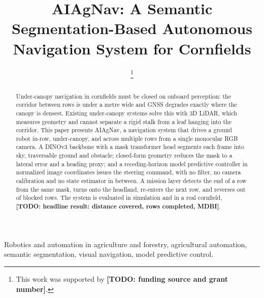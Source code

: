\documentclass[conference]{IEEEtran}
\newcommand{\TODO}[1]{\textbf{[TODO: #1]}}
\begin{document}
\title{AIAgNav: A Semantic Segmentation-Based Autonomous\\
       Navigation System for Cornfields}

\author{
%
\thanks{This work was supported by \TODO{funding source and grant number}.}}

\maketitle

\begin{abstract}
Under-canopy navigation in cornfields must be closed on onboard perception:
the corridor between rows is under a metre wide and GNSS degrades exactly where
the canopy is densest. Existing under-canopy systems solve this with 3D LiDAR,
which measures geometry and cannot separate a rigid stalk from a leaf hanging
into the corridor. This paper presents AIAgNav, a navigation system that drives
a ground robot in-row, under-canopy, and across multiple rows from a single
monocular RGB camera. A DINOv3 backbone with a mask transformer head segments
each frame into sky, traversable ground and obstacle; closed-form geometry
reduces the mask to a lateral error and a heading proxy; and a receding-horizon
model predictive controller in normalized image coordinates issues the steering
command, with no filter, no camera calibration and no state estimator in
between. A mission layer detects the end of a row from the same mask, turns onto
the headland, re-enters the next row, and reverses out of blocked rows. The
system is evaluated in simulation and in a real cornfield,
\TODO{headline result: distance covered, rows completed, MDBI}.
\end{abstract}

\begin{IEEEkeywords}
Robotics and automation in agriculture and forestry, agricultural automation,
semantic segmentation, visual navigation, model predictive control.
\end{IEEEkeywords}

\end{document}
